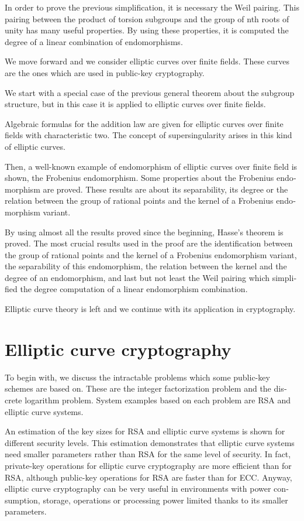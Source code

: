 \begin{otherlanguage}{american}
In order to prove the previous simplification, it is necessary the Weil pairing. This pairing between the product of torsion subgroups and the group of nth roots of unity has many useful properties. By using these properties, it is computed the degree of a linear combination of endomorphisms.

We move forward and we consider elliptic curves over finite fields. These curves are the ones which are used in public-key cryptography.

We start with a special case of the previous general theorem about the subgroup structure, but in this case it is applied to elliptic curves over finite fields.

Algebraic formulas for the addition law are given for elliptic curves over finite fields with characteristic two. The concept of supersingularity arises in this kind of elliptic curves.

Then, a well-known example of endomorphism of elliptic curves over finite field is shown, the Frobenius endomorphism. Some properties about the Frobenius endomorphism are proved. These results are about its separability, its degree or the relation between the group of rational points and the kernel of a Frobenius endomorphism variant.

By using almost all the results proved since the beginning, Hasse's theorem is proved. The most crucial results used in the proof are the identification between the group of rational points and the kernel of a Frobenius endomorphism variant, the separability of this endomorphism, the relation between the kernel and the degree of an endomorphism, and last but not least the Weil pairing which simplified the degree computation of a linear endomorphism combination.

Elliptic curve theory is left and we continue with its application in cryptography.


\section*{Elliptic curve cryptography}

To begin with, we discuss the intractable problems which some public-key schemes are based on. These are the integer factorization problem and the discrete logarithm problem. System examples based on each problem are RSA and elliptic curve systems.

An estimation of the key sizes for RSA and elliptic curve systems is shown for different security levels. This estimation demonstrates that elliptic curve systems need smaller parameters rather than RSA for the same level of security. In fact, private-key operations for elliptic curve cryptography are more efficient than for RSA, although public-key operations for RSA are faster than for ECC. Anyway, elliptic curve cryptography can be very useful in environments with power consumption, storage, operations or processing power limited thanks to its smaller parameters.


\end{otherlanguage}
